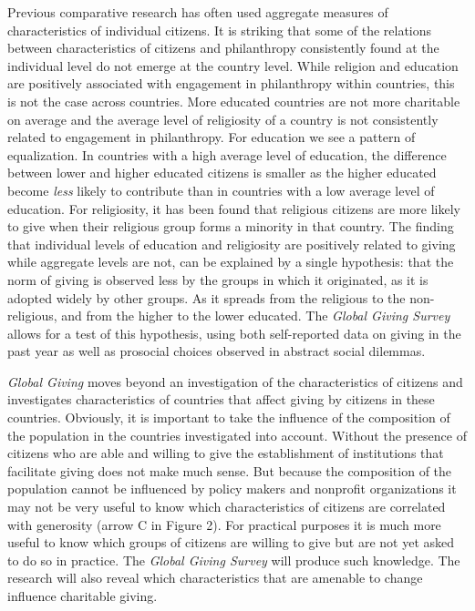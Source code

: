 \documentclass[twocolumn, serif, rga, numeric]{jote-article}
\begin{document}
Previous comparative research has often used aggregate measures of characteristics of individual citizens. It is striking that some of the relations between characteristics of citizens and philanthropy consistently found at the individual level do not emerge at the country level. While religion and education are positively associated with engagement in philanthropy within countries, this is not the case across countries. More educated countries are not more charitable on average\cite{Gesthuizen2008} and the average level of religiosity of a country is not consistently related to engagement in philanthropy.\cite{Wiepking2015} For education we see a pattern of equalization. In countries with a high average level of education, the difference between lower and higher educated citizens is smaller as the higher educated become \emph{less} likely to contribute than in countries with a low average level of education. For religiosity, it has been found that religious citizens are more likely to give when their religious group forms a minority in that country.\cite{Wiepking2015} The finding that individual levels of education and religiosity are positively related to giving while aggregate levels are not, can be explained by a single hypothesis: that the norm of giving is observed less by the groups in which it originated, as it is adopted widely by other groups. As it spreads from the religious to the non-religious, and from the higher to the lower educated. The \emph{Global Giving Survey} allows for a test of this hypothesis, using both self-reported data on giving in the past year as well as prosocial choices observed in abstract social dilemmas.

\emph{Global Giving} moves beyond an investigation of the characteristics of citizens and investigates characteristics of countries that affect giving by citizens in these countries. Obviously, it is important to take the influence of the composition of the population in the countries investigated into account. Without the presence of citizens who are able and willing to give the establishment of institutions that facilitate giving does not make much sense. But because the composition of the population cannot be influenced by policy makers and nonprofit organizations it may not be very useful to know which characteristics of citizens are correlated with generosity (arrow C in Figure 2).\cite{Minkov2017} For practical purposes it is much more useful to know which groups of citizens are willing to give but are not yet asked to do so in practice. The \emph{Global Giving Survey} will produce such knowledge. The research will also reveal which characteristics that are amenable to change influence charitable giving.
\end{document}
